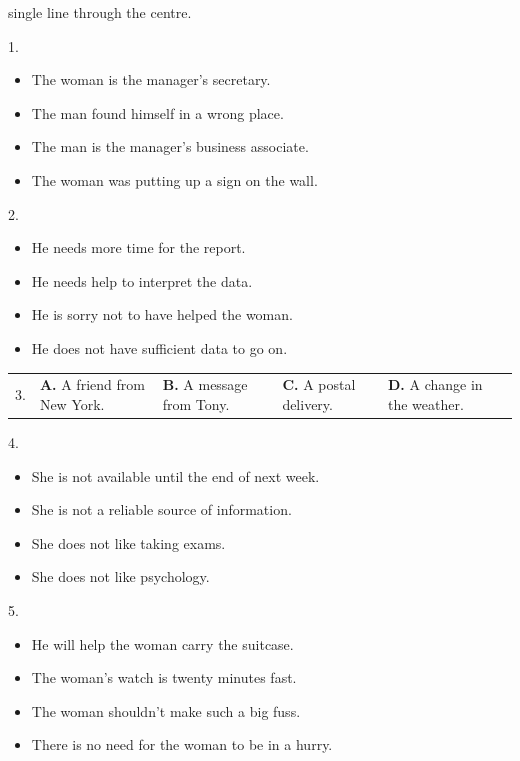 \documentclass[UTF8,11pt]{ctexart}
\begin{document}
single line through the centre.


1.


\begin{itemize}[leftmargin=2em,itemsep=.2em,topsep=.4em]\item[A.] The woman is the manager's secretary.
\item[B.] The man found himself in a wrong place.
\item[C.] The man is the manager’s business associate.
\item[D.] The woman was putting up a sign on the wall.
\end{itemize}

2.


\begin{itemize}[leftmargin=2em,itemsep=.2em,topsep=.4em]\item[A.] He needs more time for the report.
\item[B.] He needs help to interpret the data.
\item[C.] He is sorry not to have helped the woman.
\item[D.] He does not have sufficient data to go on.
\end{itemize}

\noindent\begin{tabularx}{\linewidth}{@{}lXXXX@{}}3. & \textbf{A.} A friend from New York. & \textbf{B.} A message from Tony. & \textbf{C.} A postal delivery. & \textbf{D.} A change in the weather.\\\end{tabularx}\par

4.


\begin{itemize}[leftmargin=2em,itemsep=.2em,topsep=.4em]\item[A.] She is not available until the end of next week.
\item[B.] She is not a reliable source of information.
\item[C.] She does not like taking exams.
\item[D.] She does not like psychology.
\end{itemize}

5.


\begin{itemize}[leftmargin=2em,itemsep=.2em,topsep=.4em]\item[A.] He will help the woman carry the suitcase.
\item[B.] The woman’s watch is twenty minutes fast.
\item[C.] The woman shouldn’t make such a big fuss.
\item[D.] There is no need for the woman to be in a hurry.
\end{itemize}
\end{document}

